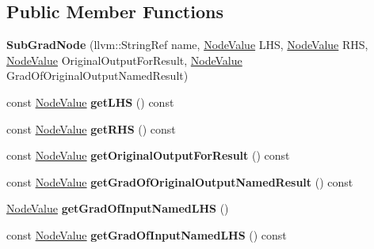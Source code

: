 \subsection*{Public Member Functions}
\begin{DoxyCompactItemize}
\item 
\mbox{\label{classglow_1_1_sub_grad_node_a0cbbc59db6d30499dde4c5f7ba427bf0}} 
{\bfseries Sub\+Grad\+Node} (llvm\+::\+String\+Ref name, \hyperlink{structglow_1_1_node_value}{Node\+Value} L\+HS, \hyperlink{structglow_1_1_node_value}{Node\+Value} R\+HS, \hyperlink{structglow_1_1_node_value}{Node\+Value} Original\+Output\+For\+Result, \hyperlink{structglow_1_1_node_value}{Node\+Value} Grad\+Of\+Original\+Output\+Named\+Result)
\item 
\mbox{\label{classglow_1_1_sub_grad_node_a6bc3d0fb37f8b18c5ee002bb25ab44a4}} 
const \hyperlink{structglow_1_1_node_value}{Node\+Value} {\bfseries get\+L\+HS} () const
\item 
\mbox{\label{classglow_1_1_sub_grad_node_aa5190f26a2eed0c1c8cf222c07848375}} 
const \hyperlink{structglow_1_1_node_value}{Node\+Value} {\bfseries get\+R\+HS} () const
\item 
\mbox{\label{classglow_1_1_sub_grad_node_a0bbf997b65b444453c7e089a19d415cd}} 
const \hyperlink{structglow_1_1_node_value}{Node\+Value} {\bfseries get\+Original\+Output\+For\+Result} () const
\item 
\mbox{\label{classglow_1_1_sub_grad_node_a413f51524e31c155e4e89c12d7624687}} 
const \hyperlink{structglow_1_1_node_value}{Node\+Value} {\bfseries get\+Grad\+Of\+Original\+Output\+Named\+Result} () const
\item 
\mbox{\label{classglow_1_1_sub_grad_node_a2c5e51f63d2c8fa9c6af49ec275c24cb}} 
\hyperlink{structglow_1_1_node_value}{Node\+Value} {\bfseries get\+Grad\+Of\+Input\+Named\+L\+HS} ()
\item 
\mbox{\label{classglow_1_1_sub_grad_node_a55d230d8176b1aff48f28d2f133258f7}} 
const \hyperlink{structglow_1_1_node_value}{Node\+Value} {\bfseries get\+Grad\+Of\+Input\+Named\+L\+HS} () const

\end{DoxyCompactItemize}
